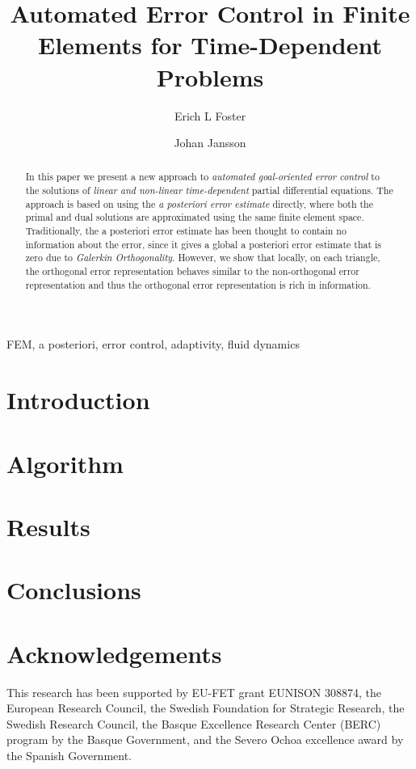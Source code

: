 \documentclass[a4paper]{article}
\author[1]{Erich L Foster}
\author[1,2]{Johan Jansson}
\affil[1]{Basque Center for Applied Mathematics, Bilbao, Basque Country -- Spain}
\affil[2]{CSC, KTH Royal Institute of Technology, Stockholm, Sweden}
\title{Automated Error Control in Finite Elements for Time-Dependent Problems}
\begin{document}
  \maketitle
  \tableofcontents
  \begin{abstract}
    In this paper we present a new approach to \emph{automated goal-oriented
    error control} to the solutions of \emph{linear and non-linear
    time-dependent} partial differential equations. The approach is based
    on using the \emph{a posteriori error estimate} directly, where both the
    primal and dual solutions are approximated using the same finite element
    space.  Traditionally, the a posteriori error estimate has been thought to
    contain no information about the error, since it gives a global a
    posteriori error estimate that is zero due to \emph{Galerkin
    Orthogonality}. However, we show that locally, on each triangle,
    the orthogonal error representation behaves similar to the
    non-orthogonal error representation and thus the orthogonal error
    representation is rich in information.
  \end{abstract}
  \begin{keywords}
    FEM, a posteriori, error control, adaptivity, fluid dynamics
  \end{keywords}

  \section{Introduction} \label{sec:Intro}
  

  \section{Algorithm} \label{sec:Algorithm}
  

  \section{Results} \label{sec:Results}
  

  \section{Conclusions} \label{sec:Conclusions}
  

  \section*{Acknowledgements}
  This research has been supported by EU-FET grant EUNISON 308874, the European
  Research Council, the Swedish Foundation for Strategic Research, the Swedish
  Research Council, the Basque Excellence Research Center (BERC) program by
  the Basque Government, and the Severo Ochoa excellence award by the Spanish
  Government.

  \printbibliography
\end{document}
